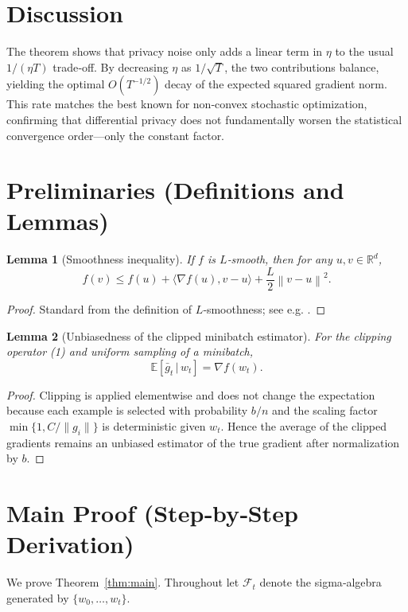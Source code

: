 \documentclass{article}
\newtheorem{lemma}{Lemma}
\newcommand{\E}{\mathbb{E}}
\newcommand{\R}{\mathbb{R}}
\newcommand{\norm}[1]{\left\|#1\right\|}
\newcommand{\grad}{\nabla}
\begin{document}
\section*{Discussion}
The theorem shows that privacy noise only adds a linear term in $\eta$ to the usual $1/(\eta T)$ trade‑off. By decreasing $\eta$ as $1/\sqrt{T}$, the two contributions balance, yielding the optimal $O(T^{-1/2})$ decay of the expected squared gradient norm. This rate matches the best known for non‑convex stochastic optimization, confirming that differential privacy does not fundamentally worsen the statistical convergence order—only the constant factor.

\newpage
\section*{Preliminaries (Definitions and Lemmas)}
\begin{lemma}[Smoothness inequality]\label{lem:smooth}
If $f$ is $L$‑smooth, then for any $u,v\in\R^d$,
\[
f(v)\le f(u)+\langle\grad f(u),v-u\rangle+\frac{L}{2}\norm{v-u}^2.
\tag{5}
\]
\end{lemma}
\begin{proof}
Standard from the definition of $L$‑smoothness; see e.g. \cite{Nesterov2004}. \qedhere
\end{proof}

\begin{lemma}[Unbiasedness of the clipped minibatch estimator]\label{lem:unbiased}
For the clipping operator (1) and uniform sampling of a minibatch,
\[
\E[\bar g_t\,|\,w_t]=\grad f(w_t).
\tag{6}
\]
\end{lemma}
\begin{proof}
Clipping is applied elementwise and does not change the expectation because each example is selected with probability $b/n$ and the scaling factor $\min\{1,C/\|g_i\|\}$ is deterministic given $w_t$. Hence the average of the clipped gradients remains an unbiased estimator of the true gradient after normalization by $b$. \qedhere
\end{proof}

\section*{Main Proof (Step‑by‑Step Derivation)}
We prove Theorem~\ref{thm:main}.  Throughout let $\mathcal F_t$ denote the sigma‑algebra generated by $\{w_0,\dots,w_t\}$.
\end{document}
